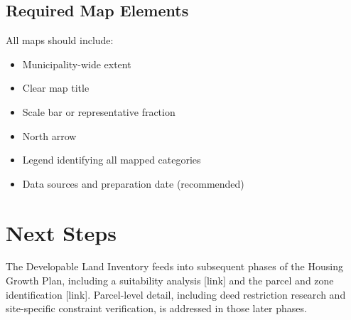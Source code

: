 \documentclass[
  letterpaper,
  DIV=11,
  numbers=noendperiod]{scrreprt}
\providecommand{\tightlist}{%
  \setlength{\itemsep}{0pt}\setlength{\parskip}{0pt}}
\begin{document}
\section{Required Map Elements}\label{required-map-elements}

All maps should include:

\begin{itemize}
\tightlist
\item
  Municipality-wide extent
\item
  Clear map title
\item
  Scale bar or representative fraction
\item
  North arrow
\item
  Legend identifying all mapped categories
\item
  Data sources and preparation date (recommended)
\end{itemize}


\chapter{Next Steps}\label{next-steps-1}

The Developable Land Inventory feeds into subsequent phases of the
Housing Growth Plan, including a suitability analysis {[}link{]} and the
parcel and zone identification {[}link{]}. Parcel-level detail,
including deed restriction research and site-specific constraint
verification, is addressed in those later phases.
\end{document}
